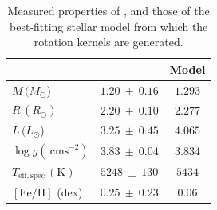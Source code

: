 \begin{table}
\centering
\begin{tabular}{|l|c|c|}
\hline
                                                  & \thestar{} & Model                  \\ \hline
$M\,(M_{\odot}$)                                   & $1.20~\pm~0.16$             & $1.293$              \\
$R\,(R_{\odot})$                                   & $2.20~\pm~0.10$             & $2.277$             \\
$L\,(L_{\odot}$)                                   & $3.25~\pm~0.45$             & $4.065$ \\
$\log{g}(\ \mathrm{cm} \mathrm{s}^{-2})$                                      & $3.83~\pm~0.04$             & $3.834$ \\
$T_{\mathrm{eff,spec}}\,(\mathrm{K})$ & $5248~\pm~130$              & $5434$     \\
$[\mathrm{Fe/H}]$ (dex)                                & $0.25~\pm~ 0.23$            & $0.06$ \\
\hline
\end{tabular}
\caption{Measured properties of \thestar{} \citep{deheuvels_seismic_2014}, and those of the best-fitting stellar model from which the rotation kernels are generated.
}
\label{tab:kictab}
\end{table}


